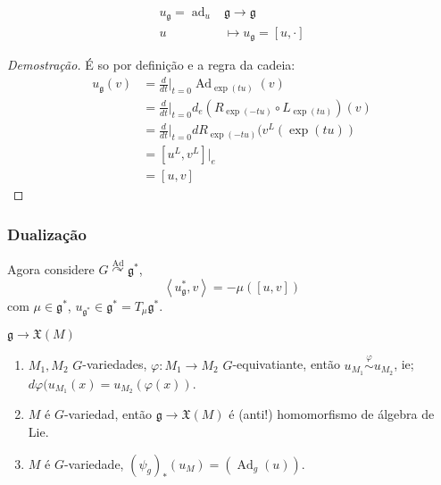 \begin{example}
\begin{itemize}
\end{itemize}

\begin{lemma}
	 \begin{align*}
		u_\mathfrak{g} =\operatorname{ad}_u &\mathfrak{g}\longrightarrow \mathfrak{g} \\
		u &\longmapsto u_\mathfrak{g} =[u,\cdot ]
	\end{align*}
\end{lemma}

\begin{proof}[Demostração]
	É so por definição e a regra da cadeia:
	\begin{align*}
		u_{\mathfrak{g}}(v)&=\frac{d}{dt}\Big|_{t=0}\operatorname{Ad}_{\operatorname{exp}(tu)}(v)\\
				   &=\frac{d}{dt}\Big|_{t=0}d_e(R_{\operatorname{exp}(-tu)}\circ  L_{\operatorname{exp}(tu)})(v)\\
		&=\frac{d}{dt}\Big|_{t=0}dR_{\operatorname{exp}(-tu)}(v^L(\operatorname{exp}(tu))\\
		&=[u^L,v^L]|_{e}\\
		&=[u,v]
	\end{align*}
\end{proof}
\end{example}

\subsubsection{Dualização}
Agora considere $G\overset{\operatorname{Ad}}{\curvearrowright }\mathfrak{g}^*$,
\[\left<u_{\mathfrak{g}}^*,v\right> =-\mu\left( [u,v] \right) \]
com $\mu\in\mathfrak{g}^*$, $u_{\mathfrak{g}^*}\in\mathfrak{g}^*=T_\mu\mathfrak{g}^*$.

\begin{question}
	$\mathfrak{g} \to \mathfrak{X}(M)$
\end{question}

\begin{prop}\leavevmode 
	\begin{enumerate}
		\item $M_1,M_2$ $G$-variedades, $ \varphi:M_1\to M_2$ $G$-equivatiante, então $u_{M_1}\overset{\varphi}{\sim}u_{M_2}$, ie; $d\varphi (u_{M_1}(x)=u_{M_2}(\varphi(x))$.

		\item $M$ é $G$-variedad, então $\mathfrak{g} \to \mathfrak{X}(M)$ é (anti!) homomorfismo de álgebra de Lie.

		\item $M$  é $G$-variedade, $(\psi_g)_*(u_M)=(\operatorname{Ad}_g(u))$.
	\end{enumerate}
\end{prop}

